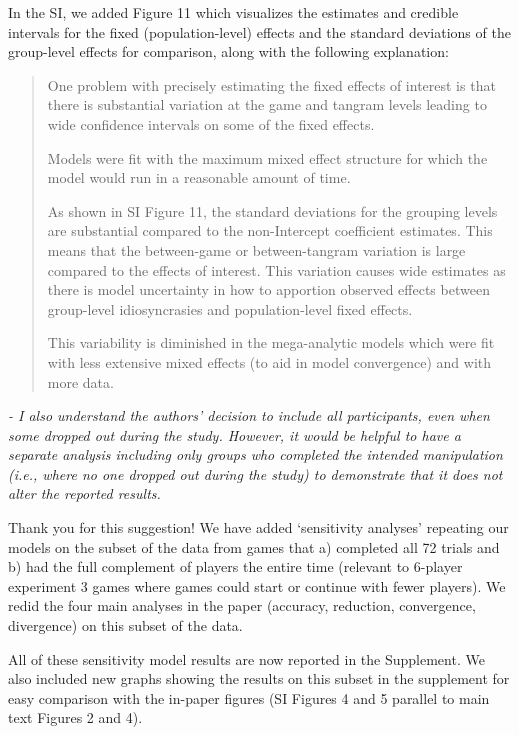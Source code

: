 \documentclass{stanfordletter}
\newcommand{\theysaid}[1]{\begin{leftbar} \noindent 
		\textsl{ #1}\end{leftbar}}
\newcommand{\revised}[1]{\begin{quote}	#1 \end{quote}}
\begin{document}
\begin{letter}{}
          In the SI, we added Figure 11 which visualizes the estimates and credible intervals for the fixed (population-level) effects and the standard deviations of the group-level effects for comparison, along with the following explanation: 
          
          \revised{One problem with precisely estimating the fixed effects of interest is that there is substantial variation at the game and tangram levels leading to wide confidence intervals on some of the fixed effects.
          	
          	Models were fit with the maximum mixed effect structure for which the model would run in a reasonable amount of time. 
          	
          	As shown in SI Figure 11, the standard deviations for the grouping levels are substantial compared to the non-Intercept coefficient estimates. This means that the between-game or between-tangram variation is large compared to the effects of interest. This variation causes wide estimates as there is model uncertainty in how to apportion observed effects between group-level idiosyncrasies and population-level fixed effects.
          	
          	This variability is diminished in the mega-analytic models which were fit with less extensive mixed effects (to aid in model convergence) and with more data. }

          \theysaid{- I also understand the authors' decision to include all participants, even when some dropped out during the study. However, it would be helpful to have a separate analysis including only groups who completed the intended manipulation (i.e., where no one dropped out during the study) to demonstrate that it does not alter the reported results.}
          
          Thank you for this suggestion! We have added `sensitivity analyses' repeating our models on the subset of the data from games that a) completed all 72 trials and b) had the full complement of players the entire time (relevant to 6-player experiment 3 games where games could start or continue with fewer players). We redid the four main analyses in the paper (accuracy, reduction, convergence, divergence) on this subset of the data. 
          
          All of these sensitivity model results are now reported in the Supplement. We also included new graphs showing the results on this subset in the supplement for easy comparison with the in-paper figures (SI Figures 4 and 5 parallel to main text Figures 2 and 4). 
          

\end{letter}
\end{document}
